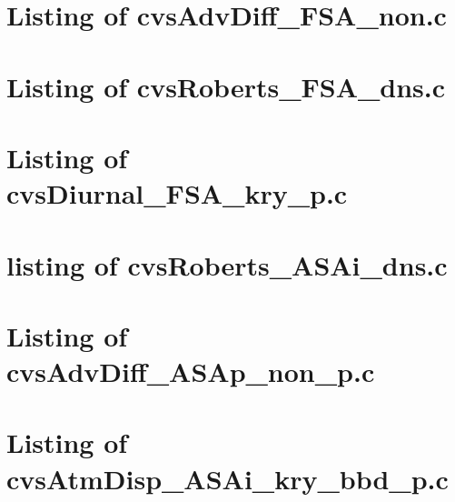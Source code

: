 
\lstset{language=C}

\newpage
\section{Listing of cvsAdvDiff\_FSA\_non.c}\label{s:cvsAdvDiff_FSA_non_c}

\newpage
\section{Listing of cvsRoberts\_FSA\_dns.c}\label{s:cvsRoberts_FSA_dns_c}

\newpage
\section{Listing of cvsDiurnal\_FSA\_kry\_p.c}\label{s:cvsDiurnal_FSA_kry_p_c}


\newpage
\section{listing of cvsRoberts\_ASAi\_dns.c}\label{s:cvsRoberts_ASAi_dns_c}

\newpage
\section{Listing of cvsAdvDiff\_ASAp\_non\_p.c}\label{s:cvsAdvDiff_ASAp_non_p_c}

\newpage
\section{Listing of cvsAtmDisp\_ASAi\_kry\_bbd\_p.c}\label{s:cvsAtmDisp_ASAi_kry_bbd_p_c}

